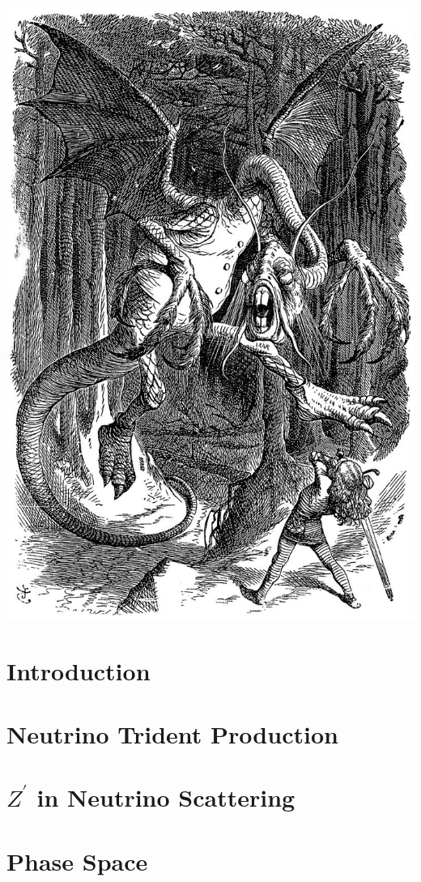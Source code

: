 \documentclass[twoside,openright,frontopenright]{ip3thesis}
\begin{document}
\includegraphics[width=\textwidth]{img/Jabberwocky.jpg}
\chapter{Introduction}


\chapter{Neutrino Trident Production}
\begin{figure}[th]
\centering
\end{figure}


\chapter{$Z^\prime$ in Neutrino Scattering}

%
%
%
%

\appendix
\chapter{Phase Space}





\end{document}
